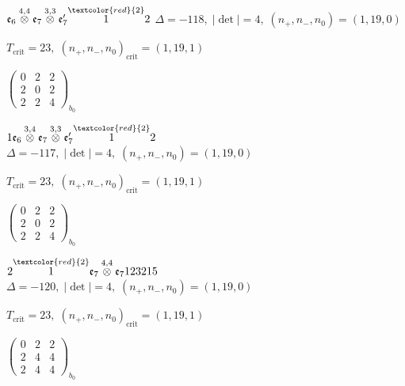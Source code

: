 \documentclass[10pt]{article}
\begin{document}
\smallskip

$\mathfrak{e}_6\overset{4,4}{\otimes}\mathfrak{e}_7\overset{3,3}{\otimes}\mathfrak{e}_7'\overset{\textcolor{red}{2}}{1}2$ \quad $\Delta=-118,\; |\det|=4,\; (n_+,n_-,n_0)=(1,19,0)$

\hspace{1em}$T_{\text{crit}}=23,\; (n_+,n_-,n_0)_{\text{crit}}=(1,19,1)$

\hspace{2em}$\left(\begin{smallmatrix}0 & 2 & 2 \\ 2 & 0 & 2 \\ 2 & 2 & 4\end{smallmatrix}\right)_{\!b_0}$

\smallskip

$1\mathfrak{e}_6\overset{3,4}{\otimes}\mathfrak{e}_7\overset{3,3}{\otimes}\mathfrak{e}_7'\overset{\textcolor{red}{2}}{1}2$ \quad $\Delta=-117,\; |\det|=4,\; (n_+,n_-,n_0)=(1,19,0)$

\hspace{1em}$T_{\text{crit}}=23,\; (n_+,n_-,n_0)_{\text{crit}}=(1,19,1)$

\hspace{2em}$\left(\begin{smallmatrix}0 & 2 & 2 \\ 2 & 0 & 2 \\ 2 & 2 & 4\end{smallmatrix}\right)_{\!b_0}$

\smallskip

$2\overset{\textcolor{red}{2}}{1}\mathfrak{e}_7\overset{4,4}{\otimes}\mathfrak{e}_7123215$ \quad $\Delta=-120,\; |\det|=4,\; (n_+,n_-,n_0)=(1,19,0)$

\hspace{1em}$T_{\text{crit}}=23,\; (n_+,n_-,n_0)_{\text{crit}}=(1,19,1)$

\hspace{2em}$\left(\begin{smallmatrix}0 & 2 & 2 \\ 2 & 4 & 4 \\ 2 & 4 & 4\end{smallmatrix}\right)_{\!b_0}$
\end{document}
